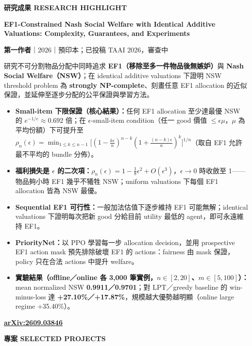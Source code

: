 \documentclass[10pt,a4paper]{article}
\newcommand{\cvsection}[2]{%
  {\color{navy}\fontsize{12}{16}\selectfont\bfseries #1\hfill
  {\color{teal}\fontsize{7.2}{9}\selectfont #2}}\par
  \vspace{3pt}{\color{rulecolor}\hrule height 0.6pt}\vspace{7pt}}
\begin{document}
\begin{minipage}[t]{121mm}
\vspace{0pt}
\fontsize{9.2}{13.5}\selectfont
\cvsection{研究成果}{RESEARCH HIGHLIGHT}
{\color{navy}\fontsize{9.8}{13}\selectfont\bfseries
EF1-Constrained Nash Social Welfare with Identical Additive Valuations: Complexity, Guarantees, and Experiments\par}
\vspace{4pt}
\textbf{第一作者}\enspace\textcolor{muted}{｜2026｜預印本；已投稿 TAAI 2026，審查中}\par
\vspace{3pt}
研究不可分割物品分配中同時追求 \textbf{EF1（移除至多一件物品後無嫉妒）}與 \textbf{Nash Social Welfare（NSW）}；在 identical additive valuations 下證明 NSW threshold problem 為 \textbf{strongly NP-complete}、刻畫任意 EF1 allocation 的近似保證，並延伸至逐步分配的公平保證與學習方法。\par
\begin{itemize}
\item \textbf{Small-item 下限保證（核心結果）：}任何 EF1 allocation 至少達最優 NSW 的 $e^{-1/e}\approx0.692$ 倍；在 $\epsilon$-small-item condition（任一 good 價值 $\le\epsilon\mu$，$\mu$ 為平均份額）下可提升至 $\rho_n(\epsilon)=\min_{1\le k\le n-1}\big[(1-\tfrac{k\epsilon}{n})^{n-k}(1+\tfrac{(n-k)\epsilon}{n})^{k}\big]^{1/n}$（取自 EF1 允許最不平均的 bundle 分佈）。
\item \textbf{福利損失是 $\epsilon$ 的二次項：}$\rho_n(\epsilon)=1-\tfrac{1}{8}\epsilon^{2}+O(\epsilon^{3})$，$\epsilon\to0$ 時收斂至 1——物品夠小時 EF1 幾乎不犧牲 NSW；uniform valuations 下每個 EF1 allocation 皆為 NSW 最優。
\item \textbf{Sequential EF1 可行性：}一般加法估值下逐步維持 EF1 可能無解；identical valuations 下證明每次把新 good 分給目前 utility 最低的 agent，即可永遠維持 EF1。
\item \textbf{PriorityNet：}以 PPO 學習每一步 allocation decision，並用 prospective EF1 action mask 預先排除破壞 EF1 的 actions：fairness 由 mask 保證，policy 只在合法 actions 中提升 welfare。
\item \textbf{實驗結果（offline／online 各 3,000 筆實例，$n\in[2,20]$、$m\in[5,100]$）：}mean normalized NSW \textbf{0.9911／0.9701}；對 LPT／greedy baseline 的 win-minus-loss 達 \textbf{+27.10\%／+17.87\%}，規模越大優勢越明顯（online large regime +35.40\%）。
\end{itemize}
\href{https://arxiv.org/abs/2609.03846}{\textbf{arXiv:2609.03846}}

\vspace{8pt}
\cvsection{專案}{SELECTED PROJECTS}


\end{minipage}
\end{document}
